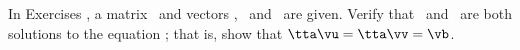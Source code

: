 {\noin In Exercises}
{, a matrix \tta\ and vectors \vb, \vu\ and \vv\ are given. Verify that \vu\ and \vv\ are both solutions to the equation \ttaxb; that is, show that $\tta\vu=\tta\vv=\vb$.}
